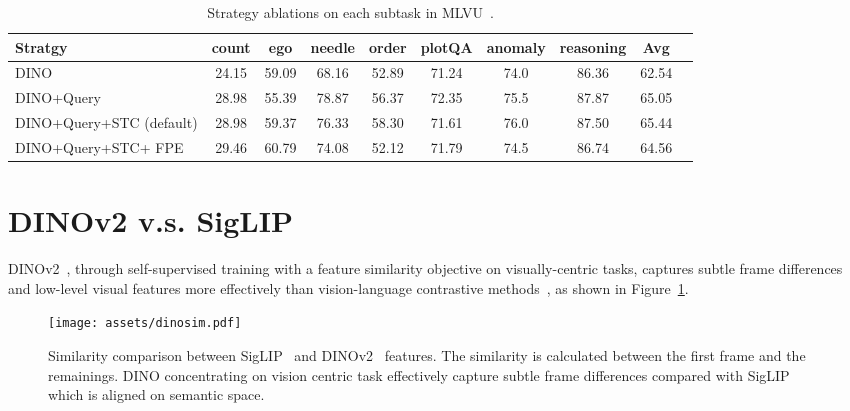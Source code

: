 \begin{table}[!htbp]
    \centering
\begin{adjustbox}{width=0.95\linewidth,center}
\begin{tabular}{lccccccccc}
\toprule \textbf{Stratgy} & \multicolumn{1}{c}{ \textbf{count} } & \multicolumn{1}{c}{ \textbf{ego} } &  \multicolumn{1}{c}{\textbf{needle}} & \multicolumn{1}{c}{ \textbf{order} } & \multicolumn{1}{c}{\textbf{plotQA}} & \multicolumn{1}{c}{\textbf{anomaly}} & \multicolumn{1}{c}{\textbf{reasoning}} & \multicolumn{1}{c}{\textbf{Avg}} \\
\midrule
DINO & 24.15 & 59.09 & 68.16 & 52.89 & 71.24 & 74.0 & 86.36 & 62.54 \\
DINO+Query & 28.98 & 55.39 & 78.87 & 56.37 & 72.35	 & 75.5 & 87.87 & 65.05 \\
\rowcolor{blue!10} DINO+Query+STC (default) & 28.98 & 59.37 & 76.33 & 58.30	& 71.61 & 76.0 & 87.50 & 65.44 \\
DINO+Query+STC+ FPE & 29.46 & 60.79 & 74.08 & 52.12	& 71.79	& 74.5	& 86.74 & 64.56 \\
\bottomrule
\end{tabular}
\end{adjustbox}
\caption{Strategy ablations on each subtask in MLVU~\citep{zhou2024mlvu}.}
\label{tab:mlvufpe}
\end{table}

\section{DINOv2 v.s. SigLIP}

DINOv2~\citep{oquab2023dinov2}, through self-supervised training with a feature similarity objective on visually-centric tasks, captures subtle frame differences and low-level visual features more effectively than vision-language contrastive methods~\citep{radford2021learning,zhai2023sigmoid}, as shown in Figure~\ref{fig:dinosim}.

\begin{figure}[h]
    \centering
    \texttt{[image: assets/dinosim.pdf]}
    \caption{Similarity comparison between SigLIP~\citep{zhai2023sigmoid} and DINOv2~\citep{oquab2023dinov2} features. The similarity is calculated between the first frame and the remainings. DINO concentrating on vision centric task effectively capture subtle frame differences compared with SigLIP~\citep{zhai2023sigmoid} which is aligned on semantic space.}
    \label{fig:dinosim}
\end{figure}

